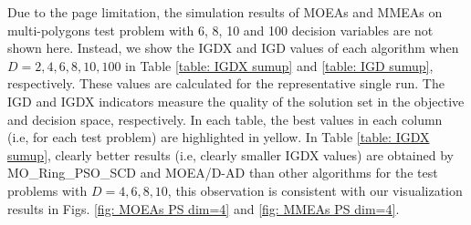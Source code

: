 \documentclass[conference]{IEEEtran}
\begin{document}
Due to the page limitation, the simulation results of MOEAs and MMEAs on multi-polygons test problem with 6, 8, 10 and 100 decision variables are not shown here. Instead, we show the IGDX\cite{liang2016multimodal} and IGD values of each algorithm when $D=2, 4, 6, 8, 10, 100$ in Table \ref{table: IGDX sumup} and \ref{table: IGD sumup}, respectively. These values are calculated for the representative single run. The IGD and IGDX indicators measure the quality of the solution set in the objective and decision space, respectively. In each table, the best values in each column (i.e, for each test problem) are highlighted in yellow. In Table \ref{table: IGDX sumup}, clearly better results (i.e, clearly smaller IGDX values) are obtained by MO\_Ring\_PSO\_SCD and MOEA/D-AD than other algorithms for the test problems with $D = 4, 6, 8, 10$, this observation is consistent with our visualization results in Figs. \ref{fig: MOEAs PS dim=4} and \ref{fig: MMEAs PS dim=4}.
\end{document}
